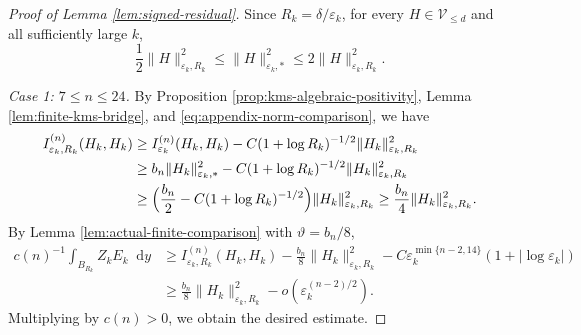 \documentclass[11pt]{article}
\numberwithin{equation}{section}
\theoremstyle{remark}
\newcommand{\dd}{\mathop{}\!\mathrm{d}}
\begin{document}
 \begin{proof}[Proof of Lemma  \ref{lem:signed-residual}]
Since $R_k=\delta/\varepsilon_k$, for every
$H\in\mathcal V_{\le d}$ and all sufficiently large $k$,
{
\begin{equation}\label{eq:appendix-norm-comparison}
 \frac12\|H\|_{\varepsilon_k,R_k}^2
 \le \|H\|_{\varepsilon_k,*}^2
 \le 2\|H\|_{\varepsilon_k,R_k}^2.
\end{equation}
}

\emph{Case  1: $7\le n\le24$.}  
By
Proposition  \ref{prop:kms-algebraic-positivity},
Lemma  \ref{lem:finite-kms-bridge}, and
 \eqref{eq:appendix-norm-comparison}, we have
{
\begin{align*}
 I_{\varepsilon_k,R_k}^{(n)}(H_k,H_k)
 &\ge I_{\varepsilon_k}^{(n)}(H_k,H_k)
 -C(1+\log R_k)^{-1/2}
  \|H_k\|_{\varepsilon_k,R_k}^2\\
 &\ge b_n\|H_k\|_{\varepsilon_k,*}^2
 -C(1+\log R_k)^{-1/2}
  \|H_k\|_{\varepsilon_k,R_k}^2\\
 &\ge \Bigl(\frac{b_n}{2}
       -C(1+\log R_k)^{-1/2}\Bigr)
       \|H_k\|_{\varepsilon_k,R_k}^2\ge \frac{b_n}{4}
       \|H_k\|_{\varepsilon_k,R_k}^2.
\end{align*}
}
 By Lemma  \ref{lem:actual-finite-comparison} with
$\vartheta=b_n/8$,
{
\begin{align*}
 c(n)^{-1}\int_{B_{R_k}}Z_kE_k\dd y
 &\ge I_{\varepsilon_k,R_k}^{(n)}(H_k,H_k)
 -\frac{b_n}{8}\|H_k\|_{\varepsilon_k,R_k}^2
 -C\varepsilon_k^{\min\{n-2,14\}}
       (1+|\log\varepsilon_k|)\\
 &\ge \frac{b_n}{8}\|H_k\|_{\varepsilon_k,R_k}^2
 -o(\varepsilon_k^{(n-2)/2}).
\end{align*}
}
 Multiplying by $c(n)>0$, we obtain the desired estimate.


\end{proof}
\end{document}
